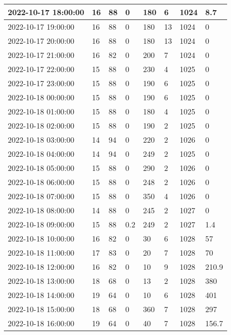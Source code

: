 \begin{longtable}{|l|l|l|l|l|l|l|l|}
        2022-10-17 18:00:00 & 16 & 88 & 0 & 180 & 6 & 1024 & 8.7 \\ \hline
        2022-10-17 19:00:00 & 16 & 88 & 0 & 180 & 13 & 1024 & 0 \\ \hline
        2022-10-17 20:00:00 & 16 & 88 & 0 & 180 & 13 & 1024 & 0 \\ \hline
        2022-10-17 21:00:00 & 16 & 82 & 0 & 200 & 7 & 1024 & 0 \\ \hline
        2022-10-17 22:00:00 & 15 & 88 & 0 & 230 & 4 & 1025 & 0 \\ \hline
        2022-10-17 23:00:00 & 15 & 88 & 0 & 190 & 6 & 1025 & 0 \\ \hline
        2022-10-18 00:00:00 & 15 & 88 & 0 & 190 & 6 & 1025 & 0 \\ \hline
        2022-10-18 01:00:00 & 15 & 88 & 0 & 180 & 4 & 1025 & 0 \\ \hline
        2022-10-18 02:00:00 & 15 & 88 & 0 & 190 & 2 & 1025 & 0 \\ \hline
        2022-10-18 03:00:00 & 14 & 94 & 0 & 220 & 2 & 1026 & 0 \\ \hline
        2022-10-18 04:00:00 & 14 & 94 & 0 & 249 & 2 & 1025 & 0 \\ \hline
        2022-10-18 05:00:00 & 15 & 88 & 0 & 290 & 2 & 1026 & 0 \\ \hline
        2022-10-18 06:00:00 & 15 & 88 & 0 & 248 & 2 & 1026 & 0 \\ \hline
        2022-10-18 07:00:00 & 15 & 88 & 0 & 350 & 4 & 1026 & 0 \\ \hline
        2022-10-18 08:00:00 & 14 & 88 & 0 & 245 & 2 & 1027 & 0 \\ \hline
        2022-10-18 09:00:00 & 15 & 88 & 0.2 & 249 & 2 & 1027 & 1.4 \\ \hline
        2022-10-18 10:00:00 & 16 & 82 & 0 & 30 & 6 & 1028 & 57 \\ \hline
        2022-10-18 11:00:00 & 17 & 83 & 0 & 20 & 7 & 1028 & 70 \\ \hline
        2022-10-18 12:00:00 & 16 & 82 & 0 & 10 & 9 & 1028 & 210.9 \\ \hline
        2022-10-18 13:00:00 & 18 & 68 & 0 & 13 & 2 & 1028 & 380 \\ \hline
        2022-10-18 14:00:00 & 19 & 64 & 0 & 10 & 6 & 1028 & 401 \\ \hline
        2022-10-18 15:00:00 & 18 & 68 & 0 & 360 & 7 & 1028 & 297 \\ \hline
        2022-10-18 16:00:00 & 19 & 64 & 0 & 40 & 7 & 1028 & 156.7 \\ \hline

\end{longtable}
